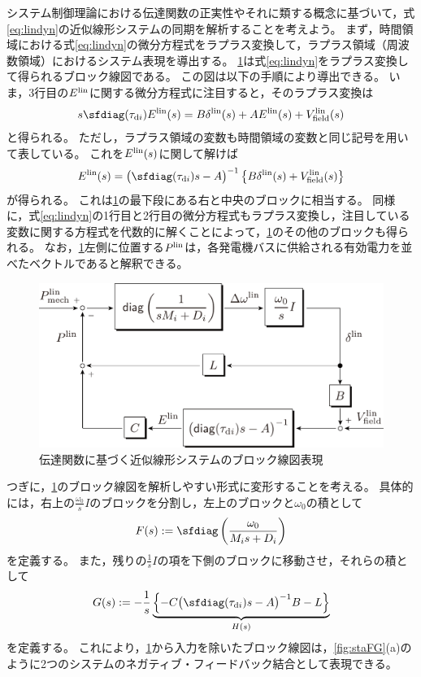 \documentclass[tombow,dvipdfmx]{corona-a5}
\begin{document}
システム制御理論における伝達関数の正実性やそれに類する概念に基づいて，式\ref{eq:lindyn}の近似線形システムの同期を解析することを考えよう。
まず，時間領域における式\ref{eq:lindyn}の微分方程式をラプラス変換して，ラプラス領域（周波数領域）におけるシステム表現を導出する。
\ref{fig:blocklin}は式\ref{eq:lindyn}をラプラス変換して得られるブロック線図である。
この図は以下の手順により導出できる。
いま，3行目の$E^{\rm lin}$に関する微分方程式に注目すると，そのラプラス変換は
\begin{align*}
s \sfdiag(\tau_{{\rm d}i}) E^{\rm lin}(s)
= B \delta^{\rm lin}(s) + A E^{\rm lin}(s) + V^{\rm lin}_{\rm field}(s)
\end{align*}
と得られる。
ただし，ラプラス領域の変数も時間領域の変数と同じ記号を用いて表している。
これを$E^{\rm lin}(s)$に関して解けば
\begin{align*}
E^{\rm lin}(s) = \bigl( \sfdiag(\tau_{{\rm d}i})s -A \bigr)^{-1} 
\left\{ B \delta^{\rm lin}(s)
+ V^{\rm lin}_{\rm field}(s) \right\}
\end{align*}
が得られる。
これは\ref{fig:blocklin}の最下段にある右と中央のブロックに相当する。
同様に，式\ref{eq:lindyn}の1行目と2行目の微分方程式もラプラス変換し，注目している変数に関する方程式を代数的に解くことによって，\ref{fig:blocklin}のその他のブロックも得られる。
なお，\ref{fig:blocklin}左側に位置する$P^{\rm lin}$は，各発電機バスに供給される有効電力を並べたベクトルであると解釈できる。

\begin{figure}[t]
\centering
\includegraphics[width = .75\linewidth]{figs/blocklinsys2}
\caption{伝達関数に基づく近似線形システムのブロック線図表現}
\label{fig:blocklin}
\end{figure}




つぎに，\ref{fig:blocklin}のブロック線図を解析しやすい形式に変形することを考える。
具体的には，右上の$\frac{\omega_0}{s}I$のブロックを分割し，左上のブロックと$\omega_0$の積として
\begin{align}\label{eq:trFs}
F(s) :=  
\sfdiag \left( 
\frac{\omega_0}{M_i s + D_i}
\right)
\end{align}
を定義する。
また，残りの$\frac{1}{s}I$の項を下側のブロックに移動させ，それらの積として
\begin{align}\label{eq:trGs}
G(s) :=  - \frac{1}{s} 
\underbrace{
\left\{ -C \bigl( \sfdiag(\tau_{{\rm d}i})s -A \bigr)^{-1} B - L \right\}
}_{H(s)}
\end{align}
を定義する。
これにより，\ref{fig:blocklin}から入力を除いたブロック線図は，\ref{fig:staFG}(a)のように2つのシステムのネガティブ・フィードバック結合として表現できる。
\end{document}
